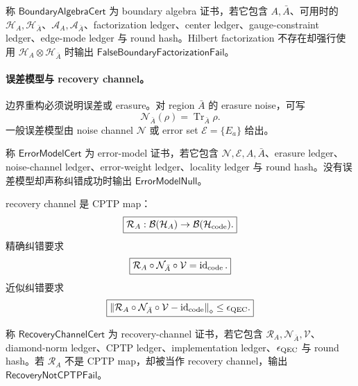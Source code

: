 \begin{definition}\label{def:typed-address-biaxial-completion-boundary-algebra-cert}
称 \(\mathsf{BoundaryAlgebraCert}\) 为 boundary algebra 证书，若它包含 \(A,\bar A\)、可用时的 \(\mathcal H_A,\mathcal H_{\bar A}\)、\(\mathcal A_A,\mathcal A_{\bar A}\)、factorization ledger、center ledger、gauge-constraint ledger、edge-mode ledger 与 round hash。Hilbert factorization 不存在却强行使用 \(\mathcal H_A\otimes\mathcal H_{\bar A}\) 时输出 \(\mathsf{FalseBoundaryFactorizationFail}\)。
\end{definition}

\paragraph{误差模型与 recovery channel。}
边界重构必须说明误差或 erasure。对 region \(\bar A\) 的 erasure noise，可写
\[
\boxed{
\mathcal N_{\bar A}(\rho)=\operatorname{Tr}_{\bar A}\rho.
}
\]
一般误差模型由 noise channel \(\mathcal N\) 或 error set \(\mathcal E=\{E_a\}\) 给出。

\begin{definition}\label{def:typed-address-biaxial-completion-error-model-cert}
称 \(\mathsf{ErrorModelCert}\) 为 error-model 证书，若它包含 \(\mathcal N,\mathcal E,A,\bar A\)、erasure ledger、noise-channel ledger、error-weight ledger、locality ledger 与 round hash。没有误差模型却声称纠错成功时输出 \(\mathsf{ErrorModelNull}\)。
\end{definition}

recovery channel 是 CPTP map：
\[
\boxed{
\mathcal R_A:\mathcal B(\mathcal H_A)\to\mathcal B(\mathcal H_{\rm code}).
}
\]
精确纠错要求
\[
\boxed{
\mathcal R_A\circ\mathcal N_{\bar A}\circ\mathcal V
=
\operatorname{id}_{\rm code}.
}
\]
近似纠错要求
\[
\boxed{
\left\|
\mathcal R_A\circ\mathcal N_{\bar A}\circ\mathcal V
-
\operatorname{id}_{\rm code}
\right\|_\diamond
\le
\epsilon_{\rm QEC}.
}
\]

\begin{definition}\label{def:typed-address-biaxial-completion-recovery-channel-cert}
称 \(\mathsf{RecoveryChannelCert}\) 为 recovery-channel 证书，若它包含 \(\mathcal R_A,\mathcal N_{\bar A},\mathcal V\)、diamond-norm ledger、CPTP ledger、implementation ledger、\(\epsilon_{\rm QEC}\) 与 round hash。若 \(\mathcal R_A\) 不是 CPTP map，却被当作 recovery channel，输出 \(\mathsf{RecoveryNotCPTPFail}\)。
\end{definition}

